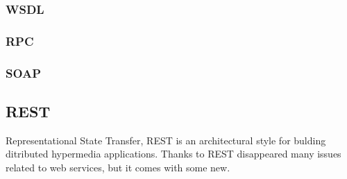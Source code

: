 \subsubsection{WSDL}
\subsubsection{RPC}
\subsubsection{SOAP}

\subsection{REST}

Representational State Transfer, REST is an architectural style for bulding ditributed hypermedia applications.
Thanks to REST disappeared many issues related to web services, but it comes with some new.

    

